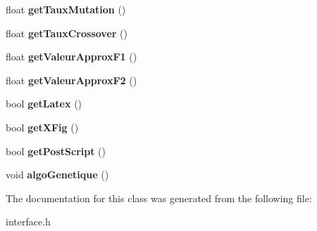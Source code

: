 \begin{DoxyCompactItemize}
float {\bfseries get\+Taux\+Mutation} ()
\item 
\mbox{\label{class_interface_a319f2bc45a2cfb2fe56a2e8795d8ef36}} 
float {\bfseries get\+Taux\+Crossover} ()
\item 
\mbox{\label{class_interface_a543c5de2681de9830c8de70e6bc14ce1}} 
float {\bfseries get\+Valeur\+Approx\+F1} ()
\item 
\mbox{\label{class_interface_ad41dc37c48ade6282b087e94757e5303}} 
float {\bfseries get\+Valeur\+Approx\+F2} ()
\item 
\mbox{\label{class_interface_a9579d9b5ac11a8aa104df9a87f7918d8}} 
bool {\bfseries get\+Latex} ()
\item 
\mbox{\label{class_interface_a27f30fe9598a6cc8629bd2e8d162cce3}} 
bool {\bfseries get\+X\+Fig} ()
\item 
\mbox{\label{class_interface_aa3b45c8bd81682e29ba7e8fee7424ae0}} 
bool {\bfseries get\+Post\+Script} ()
\item 
\mbox{\label{class_interface_ab18110b58c994e7bc4971deb8578d367}} 
void {\bfseries algo\+Genetique} ()
\end{DoxyCompactItemize}


The documentation for this class was generated from the following file\+:\begin{DoxyCompactItemize}
\item 
interface.\+h\end{DoxyCompactItemize}
